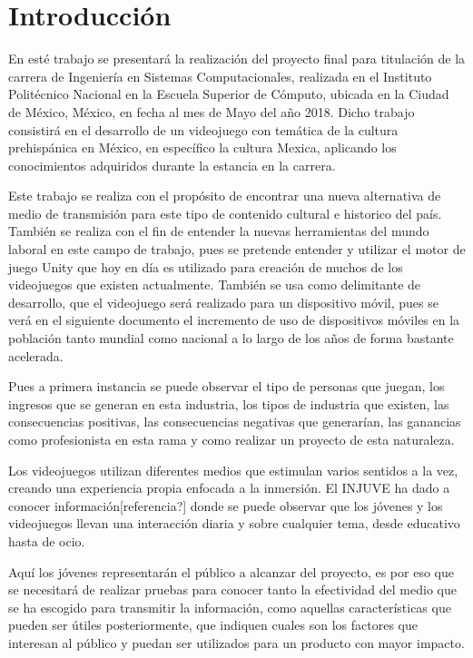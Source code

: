 \chapter{Introducción}


En esté trabajo se presentará la realización del proyecto final para titulación de la carrera de Ingeniería
en Sistemas Computacionales, realizada en el Instituto Politécnico Nacional en la Escuela Superior de Cómputo, 
ubicada en la Ciudad de México, México, en fecha al mes de Mayo del año 2018. Dicho trabajo consistirá 
en el desarrollo de un videojuego con temática de la cultura prehispánica en México, 
en específico la cultura Mexica, aplicando los conocimientos adquiridos durante la estancia en la carrera. 

Este trabajo se realiza con el propósito de encontrar una nueva alternativa de medio de transmisión para este 
tipo de contenido cultural e historico del país. También se realiza con el fin de entender la nuevas herramientas 
del mundo laboral en este campo de trabajo, pues se pretende entender y utilizar el motor de juego Unity 
que hoy en día es utilizado para creación de muchos de los videojuegos que existen actualmente. 
También se usa como delimitante de desarrollo, que el videojuego será realizado para un dispositivo móvil, 
pues se verá en el siguiente documento el incremento de uso de dispositivos móviles en la población 
tanto mundial como nacional a lo largo de los años de forma bastante acelerada.	 

Pues a primera instancia se puede observar el tipo de personas que juegan, 
los ingresos que se generan en esta industria, los tipos de industria que existen, 
las consecuencias positivas, las consecuencias negativas que generarían, 
las ganancias como profesionista en esta rama y como realizar un proyecto de esta naturaleza.

Los videojuegos utilizan diferentes medios que estimulan varios sentidos a la vez, creando una experiencia propia
enfocada a la inmersión. El INJUVE ha dado a conocer información[referencia?] donde se puede observar que los
jóvenes y los videojuegos llevan una interacción diaria y sobre cualquier tema, desde educativo hasta de ocio.

Aquí los jóvenes representarán el público a alcanzar del proyecto, es por eso que se necesitará de realizar 
pruebas para conocer tanto la efectividad del medio que se ha escogido para transmitir la información, 
como aquellas características que pueden ser útiles posteriormente, que indiquen cuales son los factores 
que interesan al público y puedan ser utilizados para un producto con mayor impacto.

